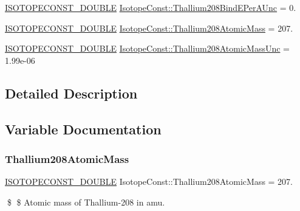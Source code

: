 \begin{DoxyCompactItemize}
\mbox{\hyperlink{group___isotope_const-_macros_ga8f45a7272ce02c0b4c65c44636ed719a}{I\+S\+O\+T\+O\+P\+E\+C\+O\+N\+S\+T\+\_\+\+D\+O\+U\+B\+LE}} \mbox{\hyperlink{group___isotope_const-_thallium-_tl208_gae603c2e2a579dae8811128ebc841c3d5}{Isotope\+Const\+::\+Thallium208\+Bind\+E\+Per\+A\+Unc}} = 0.
\item 
\mbox{\hyperlink{group___isotope_const-_macros_ga8f45a7272ce02c0b4c65c44636ed719a}{I\+S\+O\+T\+O\+P\+E\+C\+O\+N\+S\+T\+\_\+\+D\+O\+U\+B\+LE}} \mbox{\hyperlink{group___isotope_const-_thallium-_tl208_ga8faf067283fa7f9f43a39d057b5dbdd1}{Isotope\+Const\+::\+Thallium208\+Atomic\+Mass}} = 207.
\item 
\mbox{\hyperlink{group___isotope_const-_macros_ga8f45a7272ce02c0b4c65c44636ed719a}{I\+S\+O\+T\+O\+P\+E\+C\+O\+N\+S\+T\+\_\+\+D\+O\+U\+B\+LE}} \mbox{\hyperlink{group___isotope_const-_thallium-_tl208_ga270935ea889fc68bedb0d5d49093cb9a}{Isotope\+Const\+::\+Thallium208\+Atomic\+Mass\+Unc}} = 1.\+99e-\/06
\end{DoxyCompactItemize}


\subsection{Detailed Description}


\subsection{Variable Documentation}
\mbox{\label{group___isotope_const-_thallium-_tl208_ga8faf067283fa7f9f43a39d057b5dbdd1}} 
\subsubsection{\texorpdfstring{Thallium208\+Atomic\+Mass}{Thallium208AtomicMass}}
{\footnotesize\ttfamily \mbox{\hyperlink{group___isotope_const-_macros_ga8f45a7272ce02c0b4c65c44636ed719a}{I\+S\+O\+T\+O\+P\+E\+C\+O\+N\+S\+T\+\_\+\+D\+O\+U\+B\+LE}} Isotope\+Const\+::\+Thallium208\+Atomic\+Mass = 207.}

\$ \$ Atomic mass of Thallium-\/208 in amu. \mbox{\label{group___isotope_const-_thallium-_tl208_ga270935ea889fc68bedb0d5d49093cb9a}} 
